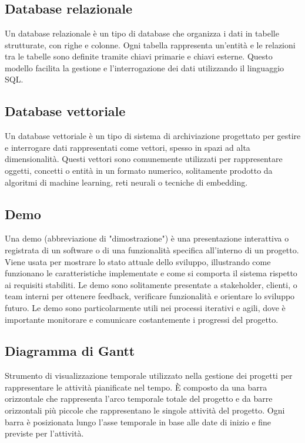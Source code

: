 
\section{}

\hypertarget{sec:database_relazionale}{}
\subsection*{Database relazionale}
Un database relazionale è un tipo di database che organizza i dati in tabelle strutturate, con righe e colonne. Ogni tabella rappresenta un'entità e le 
relazioni tra le tabelle sono definite tramite chiavi primarie e chiavi esterne. Questo modello facilita la gestione e l'interrogazione dei dati utilizzando 
il linguaggio SQL.

\hypertarget{sec:database_vettoriale}{}
\subsection*{Database vettoriale}
Un database vettoriale è un tipo di sistema di archiviazione progettato per gestire e interrogare dati rappresentati come vettori, spesso in spazi ad 
alta dimensionalità. Questi vettori sono comunemente utilizzati per rappresentare oggetti, concetti o entità in un formato numerico, solitamente prodotto 
da algoritmi di machine learning, reti neurali o tecniche di embedding.

\hypertarget{sec:demo}{}
\subsection*{Demo}
Una demo (abbreviazione di "dimostrazione") è una presentazione interattiva o registrata di un software o di una funzionalità specifica all'interno di un 
progetto. Viene usata per mostrare lo stato attuale dello sviluppo, illustrando come funzionano le caratteristiche implementate e come si comporta il 
sistema rispetto ai requisiti stabiliti. Le demo sono solitamente presentate a stakeholder, clienti, o team interni per ottenere feedback, verificare 
funzionalità e orientare lo sviluppo futuro. Le demo sono particolarmente utili nei processi iterativi e agili, dove è importante monitorare e comunicare 
costantemente i progressi del progetto.

\hypertarget{sec:diagramma_Gantt}{}
\subsection*{Diagramma di Gantt}
Strumento di visualizzazione temporale utilizzato nella gestione dei progetti per rappresentare le attività pianificate nel tempo. È composto da una barra 
orizzontale che rappresenta l’arco temporale totale del progetto e da barre orizzontali più piccole che rappresentano le singole attività del progetto. 
Ogni barra è posizionata lungo l’asse temporale in base alle date di inizio e fine previste per l’attività.

